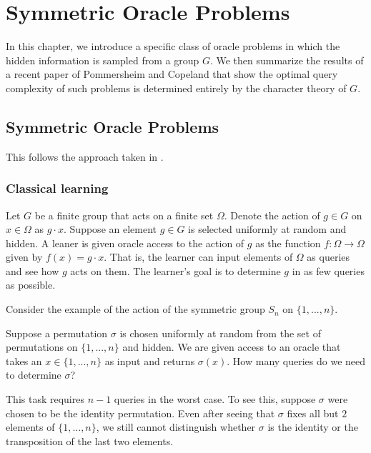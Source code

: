 
\chapter{Symmetric Oracle Problems}



In this chapter, we introduce a specific class of oracle problems in which the hidden information is sampled from a 
group $G$. We then summarize the results of a recent paper \cite{jamie} of Pommersheim and Copeland that show the 
optimal query complexity of such problems is determined entirely by the character theory of $G$. 





\section{Symmetric Oracle Problems}
This follows the approach taken in \cite{jamie}.


\subsection{Classical learning}

Let $G$ be a finite group that acts on a finite set $\Omega$. Denote the action of $g \in G$ on $x \in \Omega$ as 
$g \cdot x$. Suppose an element $g \in G$ is selected uniformly at random and hidden. A leaner is given oracle 
access to the action of $g$ as the function $f : \Omega \rightarrow \Omega$ given by $f(x) = g \cdot x$. That is, 
the learner can input elements of $\Omega$ as queries and see how $g$ acts on them. The learner's goal is to 
determine $g$ in as few queries as possible.

Consider the example of the action of the symmetric group $S_n$ on $\{1, ..., n\}$.
\begin{example}
    Suppose a permutation $\sigma$ is chosen uniformly at random from the set of permutations on $\{1, ..., n\}$ 
    and hidden. We are given access to an oracle that takes an $x \in \{1,...,n\}$ as input and returns 
    $\sigma(x)$. How many queries do we need to determine $\sigma$?
\end{example}

This task requires $n-1$ queries in the worst case. To see this, suppose $\sigma$ were chosen to be the identity 
permutation.  Even after seeing that $\sigma$ fixes all but $2$ elements of $\{1,...,n\}$, we still cannot 
distinguish whether $\sigma$ is the identity or the transposition of the last two elements.



